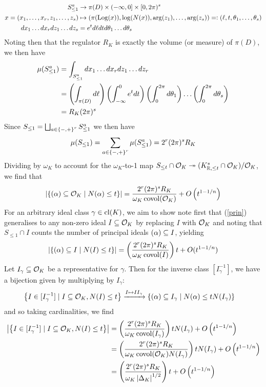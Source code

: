 \documentclass[11pt]{report}
\begin{document}
\begin{align*}
    S_{\leq 1}^a &\to \pi(D) \times (-\infty, 0] \times [0, 2\pi)^s \\
    x = (x_1, \ldots, x_r, z_1, \ldots, z_s) &\mapsto (\pi(\operatorname{Log}(x)), \log(N(x)), \arg(z_1), \ldots, \arg(z_s)) =\vcentcolon (\ell, t, \theta_1, \ldots, \theta_s) \\
    dx_1 \ldots dx_r dz_1 \ldots dz_s &= e^t d\ell dt d\theta_1 \ldots d\theta_s
\end{align*}
Noting then that the regulator $R_K$ is exactly the volume (or measure) of $\pi(D)$, we then have
\begin{align*}
    \mu(S_{\leq 1}^a) &= \int_{S_{\leq 1}^a} dx_1 \ldots dx_r dz_1 \ldots dz_r \\
    &= \left(  \int_{\pi(D)} d\ell  \right)\left(  \int_{-\infty}^0 e^t dt  \right)\left(  \int_0^{2\pi} d\theta_1  \right) \ldots \left(  \int_0^{2\pi} d\theta_s  \right) \\
    &= R_K(2\pi)^s
\end{align*}
Since $S_{\leq 1} = \bigsqcup_{a \in \left\{  -, +  \right\}^r} S_{\leq 1}^a$ we then have
$$
    \mu(S_{\leq 1}) = \sum_{a \in \left\{  -, +  \right\}^r}\mu(S_{\leq 1}^a) = 2^r(2\pi)^sR_K
$$
Dividing by $\omega_K$ to account for the $\omega_K$-to-1 map $S_{\leq t} \cap \mathcal{O}_K \twoheadrightarrow (K_{\mathbb{R}, \leq t}^* \cap \mathcal{O}_K) / \mathcal{O}_K$, we find that
\begin{align}\label{prin}
    \left| \left\{  (\alpha) \subseteq \mathcal{O}_K \mid N(\alpha) \leq t  \right\} \right| = \frac{2^r(2\pi)^sR_K}{\omega_K\operatorname{covol}(\mathcal{O}_K)} + O\left(  t^{1 - 1/n}  \right)
\end{align}
For an arbitrary ideal class $\gamma \in \operatorname{cl}(K)$, we aim to show  note first that (\ref{prin}) generalises to any non-zero ideal $I \subseteq \mathcal{O}_K$ by replacing $I$ with $\mathcal{O}_K$ and noting that $S_{\leq 1} \cap I$ counts the number of principal ideals $(\alpha) \subseteq I$, yielding
\begin{align}
    \left| \left\{  (\alpha) \subseteq I \mid N(I) \leq t  \right\} \right| = \left(  \frac{2^r(2\pi)^sR_K}{\omega_K\operatorname{covol}(I)}  \right)t + O(t^{1 - 1/n})
\end{align}
Let $I_\gamma \subseteq \mathcal{O}_K$ be a representative for $\gamma$. Then for the inverse class $[I_\gamma^{-1}]$, we have a bijection given by multiplying by $I_\gamma$:
\begin{align*}
    \left\{  I \in [I_{\gamma}^{-1}] \mid I \subseteq \mathcal{O}_K, N(I) \leq t  \right\} &\xrightarrow{I \mapsto II_\gamma} \left\{  (\alpha) \subseteq I_\gamma \mid N(\alpha) \leq tN(I_\gamma)  \right\}
\end{align*}
and so taking cardinalities, we find
\begin{align*}
    \left| \left\{  I \in [I_{\gamma}^{-1}] \mid I \subseteq \mathcal{O}_K, N(I) \leq t  \right\} \right| &= \left(  \frac{2^r(2\pi)^s R_K}{\omega_K \operatorname{covol}(I_\gamma)}  \right)tN(I_\gamma) + O\left(  t^{1 - 1/n}  \right) \\
    &= \left(  \frac{2^r(2\pi)^s R_K}{\omega_K \operatorname{covol}(\mathcal{O}_K)N(I_\gamma)}  \right)tN(I_\gamma) + O\left(  t^{1 - 1/n}  \right) \\
    &= \left(  \frac{2^r(2\pi)^s R_K}{\omega_K \left| \Delta_K \right|^{1/2}}  \right)t + O\left(  t^{1 - 1/n}  \right)
\end{align*}
\end{document}
